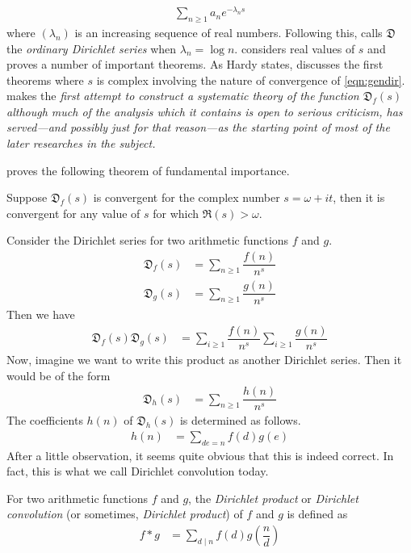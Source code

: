 \documentclass[elemannt.tex]{subfile}
\begin{document}
		\begin{align}
			\sum_{n\geq 1}a_{n}e^{-\lambda_{n}s}\label{eqn:gendir}
		\end{align}
	where $(\lambda_{n})$ is an increasing sequence of real numbers. Following this, \textcite{hardy_riesz_1915} calls $\mathfrak{D}$ the \textit{ordinary Dirichlet series} when $\lambda_{n}=\log{n}$. \textcite{lejeune_1879} considers real values of $s$ and proves a number of important theorems. As Hardy states, \textcite{jensen_1884,jensen_1888} discusses the first theorems where $s$ is complex involving the nature of convergence of \ref{eqn:gendir}. \textcite{cahen_1894} makes the \textit{first attempt to construct a systematic theory of the function $\mathfrak{D}_{f}(s)$ although much of the analysis which it contains is open to serious criticism, has served---and possibly just for that reason---as the starting point of most of the later researches in the subject.}
		\begin{definition}[Convergence]
			
		\end{definition}
	\textcite{jensen_1884} proves the following theorem of fundamental importance.
		\begin{theorem}
			Suppose $\mathfrak{D}_{f}(s)$ is convergent for the complex number $s=\omega+it$, then it is convergent for any value of $s$ for which $\Re(s)>\omega$.
		\end{theorem}
	Consider the Dirichlet series for two arithmetic functions $f$ and $g$.
		\begin{align*}
			\mathfrak{D}_{f}(s)
				& = \sum_{n\geq 1}\dfrac{f(n)}{n^{s}}\\
			\mathfrak{D}_{g}(s)
				& = \sum_{n\geq 1}\dfrac{g(n)}{n^{s}}
		\end{align*}
	Then we have
		\begin{align*}
			\mathfrak{D}_{f}(s)\mathfrak{D}_{g}(s)
				& = \sum_{i\geq 1}\dfrac{f(n)}{n^{s}}\sum_{i\geq 1}\dfrac{g(n)}{n^{s}}
		\end{align*}
	Now, imagine we want to write this product as another Dirichlet series. Then it would be of the form
		\begin{align*}
			\mathfrak{D}_{h}(s)
				& = \sum_{n\geq 1}\dfrac{h(n)}{n^{s}}
		\end{align*}
	The coefficients $h(n)$ of $\mathfrak{D}_{h}(s)$ is determined as follows.
		\begin{align*}
			h(n)
				& = \sum_{de=n}f(d)g(e)
		\end{align*}
	After a little observation, it seems quite obvious that this is indeed correct. In fact, this is what we call  Dirichlet convolution today.
		\begin{definition}
			For two arithmetic functions $f$ and $g$, the \textit{Dirichlet product} or \textit{Dirichlet convolution} (or sometimes, \textit{Dirichlet product}) of $f$ and $g$ is defined as
				\begin{align*}
					f\ast g
						& = \sum_{d\mid n}f(d)g\left(\dfrac{n}{d}\right)
				\end{align*}
		\end{definition}
	
\end{document}
